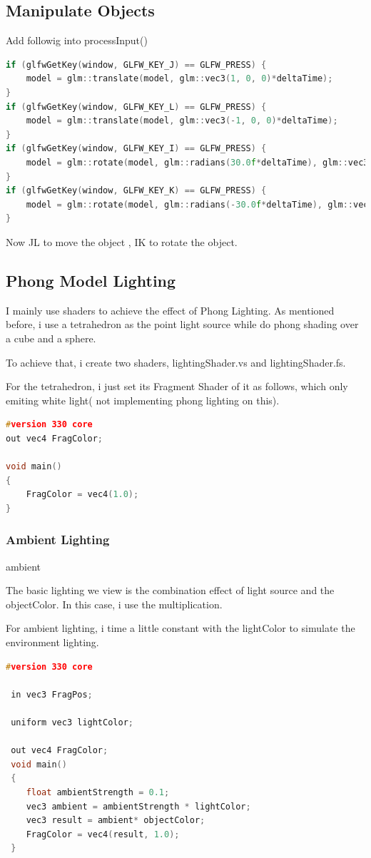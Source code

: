 \documentclass[acmtog]{acmart}
\begin{document}
\subsection{Manipulate Objects}
Add followig into processInput()
\begin{lstlisting}[frame=single,breaklines=true,language=c++,basicstyle=\footnotesize\ttfamily]
if (glfwGetKey(window, GLFW_KEY_J) == GLFW_PRESS) {
	model = glm::translate(model, glm::vec3(1, 0, 0)*deltaTime);
}
if (glfwGetKey(window, GLFW_KEY_L) == GLFW_PRESS) {
	model = glm::translate(model, glm::vec3(-1, 0, 0)*deltaTime);
}
if (glfwGetKey(window, GLFW_KEY_I) == GLFW_PRESS) {
	model = glm::rotate(model, glm::radians(30.0f*deltaTime), glm::vec3(1.0f, 1.0f, 0.0f));
}
if (glfwGetKey(window, GLFW_KEY_K) == GLFW_PRESS) {
	model = glm::rotate(model, glm::radians(-30.0f*deltaTime), glm::vec3(1.0f, 1.0f, 0.0f));
}
\end{lstlisting}
Now JL to move the object , IK to rotate the object.

\subsection{Phong Model Lighting }
I mainly use shaders to achieve the effect of Phong Lighting. As mentioned before, i use a tetrahedron as the point light source while do phong shading over a cube and a sphere. 
\par  To achieve that, i create two shaders, lightingShader.vs and lightingShader.fs.
\par For the tetrahedron, i just set its Fragment Shader of it as follows, which only emiting white light( not implementing phong lighting on this).
\begin{lstlisting}[frame=single,breaklines=true,language=c++,basicstyle=\footnotesize\ttfamily]
#version 330 core
out vec4 FragColor;

void main()
{
	FragColor = vec4(1.0);
}
\end{lstlisting}
\subsubsection{Ambient Lighting}
 ambient
 \par The basic lighting we view is the combination effect of light source and the objectColor. In this case, i use the multiplication.
 \par  For ambient lighting, i time a little constant with the lightColor to simulate the environment lighting.
 \begin{lstlisting}[frame=single,breaklines=true,language=c++,basicstyle=\footnotesize\ttfamily]
 #version 330 core
 
 in vec3 FragPos;
 
 uniform vec3 lightColor;
 
 out vec4 FragColor;
 void main()
 {
 	float ambientStrength = 0.1;
 	vec3 ambient = ambientStrength * lightColor;
 	vec3 result = ambient* objectColor;
 	FragColor = vec4(result, 1.0);
 }
 \end{lstlisting}
\end{document}
